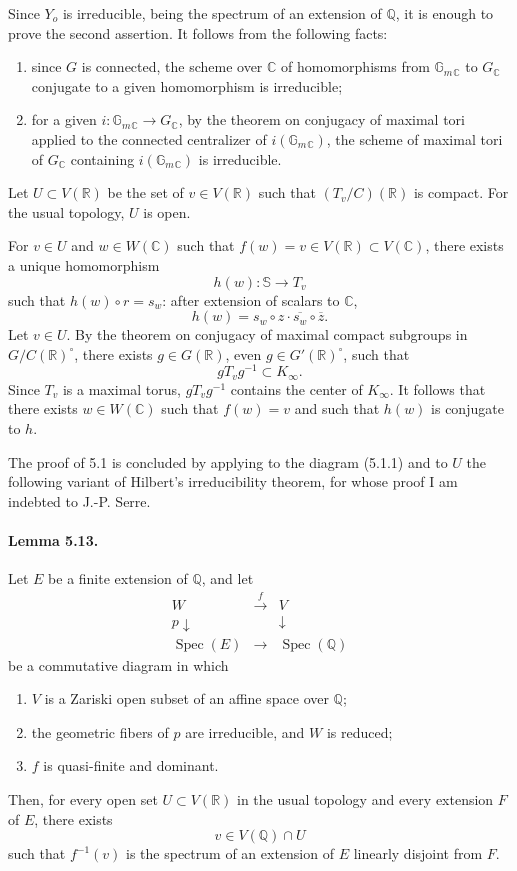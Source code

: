 \documentclass[10pt]{article}
\newcommand{\C}{\mathbb C}
\newcommand{\Gm}{\mathbb G_m}
\newcommand{\Q}{\mathbb Q}
\newcommand{\R}{\mathbb R}
\newcommand{\bS}{\mathbb S}
\newcommand{\Spec}{\operatorname{Spec}}
\begin{document}
Since $Y_o$ is irreducible, being the spectrum of an extension of $\Q$, it is enough to prove the second assertion. It follows from the following facts:
\begin{enumerate}[label=(\alph*)]
\item since $G$ is connected, the scheme over $\C$ of homomorphisms from $\Gm{}_{\C}$ to $G_{\C}$ conjugate to a given homomorphism is irreducible;
\item for a given $i:\Gm{}_{\C}\to G_{\C}$, by the theorem on conjugacy of maximal tori applied to the connected centralizer of $i(\Gm{}_{\C})$, the scheme of maximal tori of $G_{\C}$ containing $i(\Gm{}_{\C})$ is irreducible.
\end{enumerate}

Let $U\subset V(\R)$ be the set of $v\in V(\R)$ such that $(T_v/C)(\R)$ is compact. For the usual topology, $U$ is open.

For $v\in U$ and $w\in W(\C)$ such that $f(w)=v\in V(\R)\subset V(\C)$, there exists a unique homomorphism
\[
h(w):\bS\longrightarrow T_v
\]
such that $h(w)\circ r=s_w$: after extension of scalars to $\C$,
\[
h(w)=s_w\circ z\cdot \overline{s_w}\circ\overline z.
\]
Let $v\in U$. By the theorem on conjugacy of maximal compact subgroups in $G/C(\R)^\circ$, there exists $g\in G(\R)$, even $g\in G'(\R)^\circ$, such that
\[
gT_vg^{-1}\subset K_\infty.
\]
Since $T_v$ is a maximal torus, $gT_vg^{-1}$ contains the center of $K_\infty$. It follows that there exists $w\in W(\C)$ such that $f(w)=v$ and such that $h(w)$ is conjugate to $h$.

The proof of 5.1 is concluded by applying to the diagram (5.1.1) and to $U$ the following variant of Hilbert's irreducibility theorem, for whose proof I am indebted to J.-P. Serre.

\paragraph{Lemma 5.13.} Let $E$ be a finite extension of $\Q$, and let
\[
\begin{array}{ccc}
W & \xrightarrow{\ f\ } & V\\
{\scriptstyle p}\downarrow && \downarrow\\
\Spec(E) & \longrightarrow & \Spec(\Q)
\end{array}
\]
be a commutative diagram in which
\begin{enumerate}[label=(\roman*)]
\item $V$ is a Zariski open subset of an affine space over $\Q$;
\item the geometric fibers of $p$ are irreducible, and $W$ is reduced;
\item $f$ is quasi-finite and dominant.
\end{enumerate}
Then, for every open set $U\subset V(\R)$ in the usual topology and every extension $F$ of $E$, there exists
\[
v\in V(\Q)\cap U
\]
such that $f^{-1}(v)$ is the spectrum of an extension of $E$ linearly disjoint from $F$.
\end{document}

